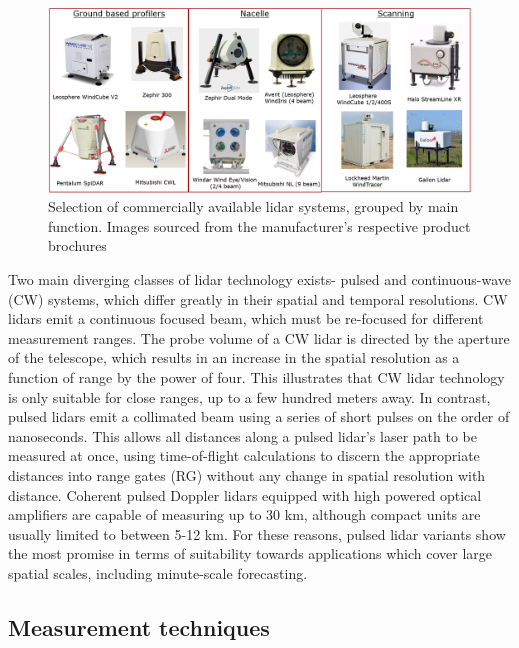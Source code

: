 \begin{figure}[htbp]
    \centering
        \includegraphics[width=1.0\textwidth]{graphics/intro/lidars.png}
    \caption{Selection of commercially available lidar systems, grouped by main function. Images sourced from the manufacturer's respective product brochures}
    \label{fig:lidars}
\end{figure}

Two main diverging classes of lidar technology exists- pulsed and continuous-wave (CW) systems, which differ greatly in their spatial and temporal resolutions. CW lidars emit a continuous focused beam, which must be re-focused for different measurement ranges. The probe volume of a CW lidar is directed by the aperture of the telescope, which results in an increase in the spatial resolution as a function of range by the power of four. This illustrates that CW lidar technology is only suitable for close ranges, up to a few hundred meters away. In contrast, pulsed lidars emit a collimated beam using a series of short pulses on the order of nanoseconds. This allows all distances along a pulsed lidar's laser path to be measured at once, using time-of-flight calculations to discern the appropriate distances into range gates (RG) without any change in spatial resolution with distance. Coherent pulsed Doppler lidars equipped with high powered optical amplifiers are capable of measuring up to 30 km, although compact units are usually limited to between 5-12 km. For these reasons, pulsed lidar variants show the most promise in terms of suitability towards applications which cover large spatial scales, including minute-scale forecasting.

\clearpage
\subsection{Measurement techniques}
\label{sec:intro_meas_tech}

